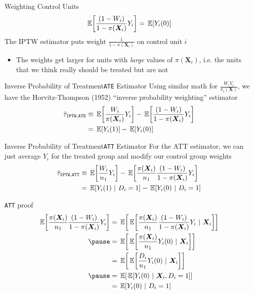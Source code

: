 \documentclass[aspectratio=169,t,11pt,table]{beamer}
\begin{document}
\begin{frame}{Weighting Control Units}
  \vspace*{-\bigskipamount}
  $$
    \expec{\frac{(1 - W_i)}{1 - \pi(\bm{X}_i)} Y_i} = \expec{Y_i(0)}
  $$
  The IPTW estimator puts weight $\frac{1}{1 - \pi(\bm{X}_i)}$ on control unit $i$
  \begin{itemize}
    \item The weights get larger for units with \emph{large} values of $\pi(\bm{X}_i)$, i.e. the units that we think really should be treated but are not
  \end{itemize}
\end{frame}

\begin{frame}{Inverse Probability of Treatment}{\texttt{ATE} Estimator}
  Using similar math for $\frac{W_i Y_i}{\pi_i(\bm{X})}$, we have the Horvitz-Thompson (1952) ``inverse probability weighting'' estimator
  \begin{align*}
    \hat{\tau}_{\texttt{IPTW},\texttt{ATE}} 
    &\equiv \expec{\frac{W_i}{\pi(\bm{X}_i)} Y_i} - \expec{\frac{(1 - W_i)}{1 - \pi(\bm{X}_i)} Y_i} \\
    &= \expec{Y_i(1)} - \expec{Y_i(0)}
  \end{align*}
\end{frame}

\begin{frame}{Inverse Probability of Treatment}{\texttt{ATT} Estimator}
  For the ATT estimator, we can just average $Y_i$ for the treated group and modify our control group weights
  \begin{align*}
    \hat{\tau}_{\texttt{IPTW},\texttt{ATT}}
    &\equiv \expec{\frac{W_i}{n_1} Y_i} - \expec{\frac{\pi(\bm{X}_i)}{n_1} \frac{(1 - W_i)}{1 - \pi(\bm{X}_i)} Y_i} \\
    &= \expec{Y_i(1)}{D_i = 1} - \expec{Y_i(0)}{D_i = 1}
  \end{align*}
\end{frame}

\begin{frame}{\texttt{ATT} proof}
  \begin{align*}
    \expec{\frac{\pi(\bm{X}_i)}{n_1} \frac{(1 - W_i)}{1 - \pi(\bm{X}_i)} Y_i} 
    &= \expec{ \expec{ \frac{\pi(\bm{X}_i)}{n_1} \frac{(1 - W_i)}{1 - \pi(\bm{X}_i)} Y_i }{\bm{X}_i} } \\ \pause
    &= \expec{ \expec{\frac{\pi(\bm{X}_i)}{n_1} Y_i(0)}{\bm{X}_i} } \\
    &= \expec{ \expec{\frac{D_i}{n_1} Y_i(0)}{\bm{X}_i} } \\ \pause
    &= \expec{ \expec{Y_i(0)}{\bm{X}_i, D_i = 1} } \\
    &= \expec{Y_i(0)}{D_i = 1}
  \end{align*}
\end{frame}
\end{document}
